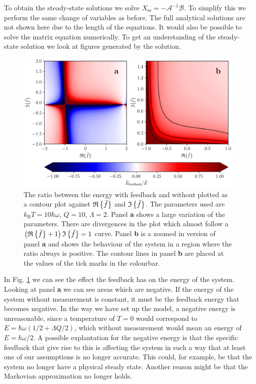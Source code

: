 To obtain the steady-state solutions we solve $X_\text{ss} = - \mathcal{A}^{-1} \mathcal{B}$. To simplify this we perform the same change of variables as before. The full analytical solutions are not shown here due to the length of the equations. It would also be possible to solve the matrix equation numerically. To get an understanding of the steady-state solution we look at figures generated by the solution.

\begin{figure}[t]
    \centering
    \includegraphics[width=\textwidth]{figures/energyFeedbackRatio.pdf}
    \caption{\small The ratio between the energy with feedback and without plotted as a contour plot against $\mathfrak{R}\left\{\tilde{f}\right\}$ and $\mathfrak{I}\left\{\tilde{f}\right\}$. The parameters used are $k_\text{B}T = 10 \hbar\omega$, $Q = 10$, $\Lambda = 2$. Panel \textbf{a} shows a large variation of the parameters. There are divergences in the plot which almost follow a $\left(\mathfrak{R}\left\{\tilde{f}\right\} + 1 \right)\mathfrak{I}\left\{\tilde{f}\right\} = 1$ curve. Panel \textbf{b} is a zoomed in version of panel \textbf{a} and shows the behaviour of the system in a region where the ratio always is positive. The contour lines in panel \textbf{b} are placed at the values of the tick marks in the colourbar.}
    \label{fig:energyFeedbackRatio}
\end{figure}
In Fig. \ref{fig:energyFeedbackRatio} we can see the effect the feedback has on the energy of the system. Looking at panel \textbf{a} we can see areas which are negative. If the energy of the system without measurement is constant, it must be the feedback energy that becomes negative. In the way we have set up the model, a negative energy is unreasonable, since a temperature of $T=0$ would correspond to $E =\hbar\omega( 1/2 + \Lambda Q/2)$, which without measurement would mean an energy of $E = \hbar\omega/2$. A possible explantation for the negative energy is that the specific feedback that give rise to this is affecting the system in such a way that at least one of our assumptions is no longer accurate. This could, for example, be that the system no longer have a physical steady state. Another reason might be that the Markovian approximation no longer holds.

